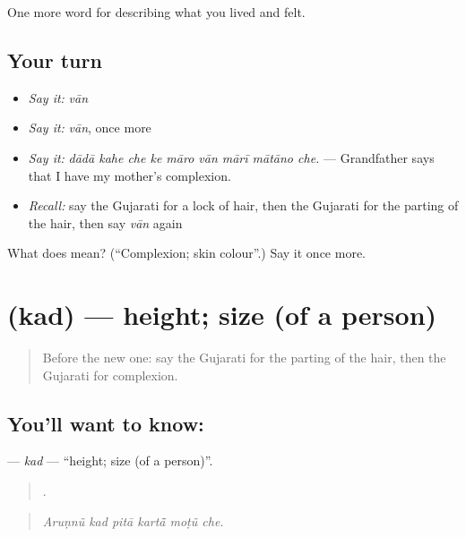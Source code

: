 \begin{grammarlens}[title={What you've built}]
One more word for describing what you lived and felt.
\end{grammarlens}

\subsection*{Your turn}
\begin{itemize}
\raggedright
  \item \emph{Say it:} \emph{vān}
  \item \emph{Say it:} \emph{vān}, once more
  \item \emph{Say it:} \emph{dādā kahe che ke māro vān mārī mātāno che.} — Grandfather says that I have my mother's complexion.
  \item \emph{Recall:} say the Gujarati for a lock of hair, then the Gujarati for the parting of the hair, then say \emph{vān} again
\end{itemize}

\begin{tcolorbox}[breakable,colback=teal!4,colframe=teal!35!black,title={Before you move on}]
What does  mean? (\textquotedblleft{}Complexion; skin colour\textquotedblright{}.) Say it once more.
\end{tcolorbox}
\section[\texorpdfstring{\gu{કદ} (kad)}{કદ (kad)}]{ (kad) — height; size (of a person)}

\label{lesson:GU-C471-kad}



\begin{quote}
Before the new one: say the Gujarati for the parting of the hair, then the Gujarati for complexion.
\end{quote}

\subsection*{You'll want to know: }
\textbf{} — \emph{kad} — \textquotedblleft{}height; size (of a person)\textquotedblright{}.

\begin{quote}
     .
\end{quote}

\begin{quote}
\emph{Aruṇnũ kad pitā kartā̃ moṭũ che.}
\end{quote}

